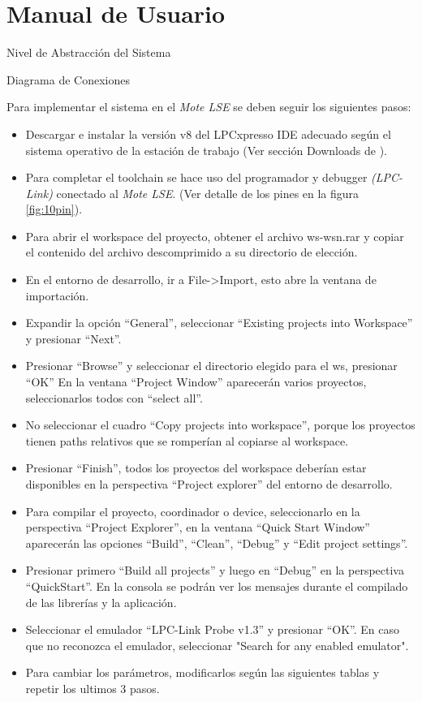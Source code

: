 
\chapter{Manual de Usuario} %

\label{AppendixA} %

Nivel de Abstracción del Sistema

Diagrama de Conexiones

Para implementar el sistema en el \textit{Mote LSE} se deben seguir los siguientes pasos:
\begin{itemize}
	\item Descargar e instalar la versión v8 del LPCxpresso IDE adecuado según el sistema operativo de la estación de trabajo (Ver sección Downloads de \citep{IDE}).
	\item Para completar el toolchain se hace uso del programador y debugger \textit{(LPC-Link)} conectado al \textit{Mote LSE}. (Ver detalle de los pines en la figura \ref{fig:10pin}).
	\item Para abrir el workspace del proyecto, obtener el archivo ws-wsn.rar y copiar el contenido del archivo descomprimido a su directorio de elección.
	\item En el entorno de desarrollo, ir a File->Import, esto abre la ventana de importación.
	\item Expandir la opción “General”, seleccionar “Existing projects into Workspace” y presionar “Next”.
	\item Presionar “Browse” y seleccionar el directorio elegido para el ws, presionar “OK” En la ventana “Project Window” aparecerán varios proyectos, seleccionarlos todos con “select all”.
	\item No seleccionar el cuadro “Copy projects into workspace”, porque los proyectos tienen paths relativos que se romperían al copiarse al workspace.
	\item Presionar “Finish”, todos los proyectos del workspace deberían estar disponibles en la perspectiva “Project explorer” del entorno de desarrollo.
	\item Para compilar el proyecto, coordinador o device, seleccionarlo en la perspectiva “Project Explorer”, en la ventana “Quick Start Window” aparecerán las opciones “Build”, “Clean”, “Debug” y “Edit project settings”.
	\item Presionar primero “Build all projects” y luego en “Debug” en la perspectiva “QuickStart”. En la consola se podrán ver los mensajes durante el compilado de las librerías y la aplicación.
	\item Seleccionar el emulador “LPC-Link Probe v1.3” y presionar “OK”. En caso que no reconozca el emulador, seleccionar "Search for any enabled emulator".
	\item Para cambiar los parámetros, modificarlos según las siguientes tablas y repetir los ultimos 3 pasos.
	\end{itemize}

